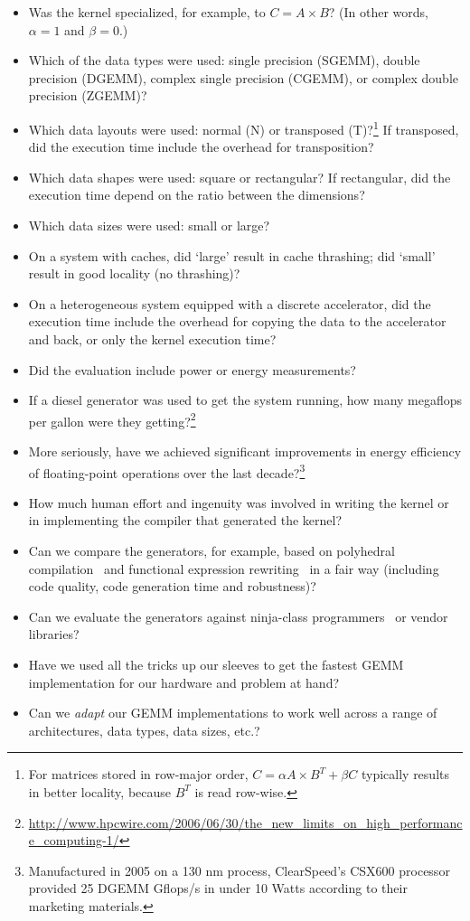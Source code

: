 \documentclass{acm_proc_article-sp} %
\begin{document}
\begin{itemize}
%
\item Was the kernel specialized, for example, to $C = A \times B$? (In other
words, $\alpha=1$ and $\beta=0$.)
%
\item Which of the data types were used: single precision (SGEMM), double
precision (DGEMM), complex single precision (CGEMM), or complex double
precision (ZGEMM)?
%
\item Which data layouts were used: normal (N) or transposed (T)?\footnote{For
matrices stored in row-major order, $C = \alpha A \times B^{T} + \beta C$
typically results in better locality, because $B^{T}$ is read row-wise.} If
transposed, did the execution time include the overhead for transposition?
%
\item Which data shapes were used: square or rectangular? If rectangular, did
the execution time depend on the ratio between the dimensions?
%
\item Which data sizes were used: small or large?
%
\item On a system with caches, did `large' result in cache thrashing; did
`small' result in good locality (no thrashing)?
%
\item On a heterogeneous system equipped with a discrete accelerator, did the
execution time include the overhead for copying the data to the accelerator and
back, or only the kernel execution time?
%
\item Did the evaluation include power or energy measurements?
%
\item If a diesel generator was used to get the system running, how many
megaflops per gallon were they
getting?\footnote{\url{http://www.hpcwire.com/2006/06/30/the_new_limits_on_high_performance_computing-1/}}
%
\item More seriously, have we achieved significant improvements in energy
efficiency of floating-point operations over the last
decade?\footnote{Manufactured in 2005 on a 130 nm process, ClearSpeed's CSX600
processor provided 25 DGEMM Gflops/s in under 10 Watts according to their
marketing materials.}
%
\item How much human effort and ingenuity was involved in writing the kernel or
in implementing the compiler that generated the kernel?
%
\item Can we compare the generators, for example, based on polyhedral
compilation~\cite{Beaugnon:2014} and functional expression
rewriting~\cite{Steuwer:2015} in a fair way (including code quality, code
generation time and robustness)?
%
\item Can we evaluate the generators against ninja-class
programmers~\cite{Goto:2008} or vendor libraries?
%
\item Have we used all the tricks up our sleeves to get the fastest GEMM
implementation for our hardware and problem at hand?
%
\item Can we {\em adapt} our GEMM implementations to work well across a range
of architectures, data types, data sizes, etc.?
%
\end{itemize}
\end{document}
